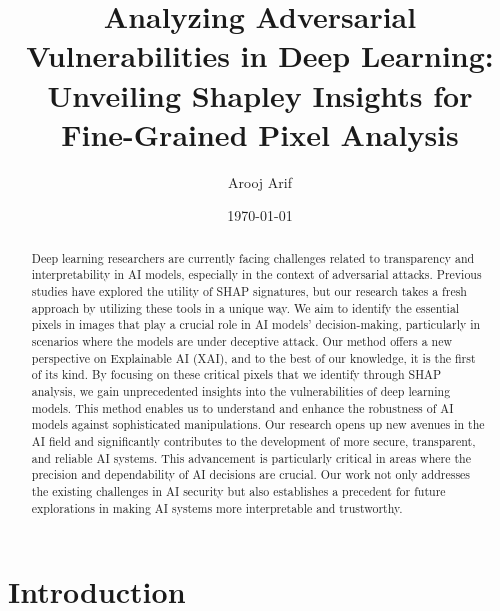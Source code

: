 \documentclass[10pt, conference, a4paper, final]{IEEEtran}
\title{Analyzing Adversarial Vulnerabilities in Deep Learning: Unveiling Shapley Insights for Fine-Grained Pixel Analysis}
\author{Arooj Arif}
\date{\today} %
\begin{document}
\maketitle %


\begin{abstract}
    Deep learning researchers are currently facing challenges related to transparency and interpretability in AI models, 
    especially in the context of adversarial attacks. Previous studies have explored the utility of SHAP signatures, but 
    our research takes a fresh approach by utilizing these tools in a unique way. We aim to identify the essential pixels 
    in images that play a crucial role in AI models' decision-making, particularly in scenarios where the models are under 
    deceptive attack. Our method offers a new perspective on Explainable AI (XAI), and to the best of our knowledge, it is 
    the first of its kind. By focusing on these critical pixels that we identify through SHAP analysis, we gain unprecedented 
    insights into the vulnerabilities of deep learning models. This method enables us to understand and enhance the robustness 
    of AI models against sophisticated manipulations. Our research opens up new avenues in the AI field and significantly contributes 
    to the development of more secure, transparent, and reliable AI systems. This advancement is particularly critical in areas where 
    the precision and dependability of AI decisions are crucial. Our work not only addresses the existing challenges in AI security 
    but also establishes a precedent for future explorations in making AI systems more interpretable and trustworthy.
    

\end{abstract}

\section{Introduction}
\end{document}
